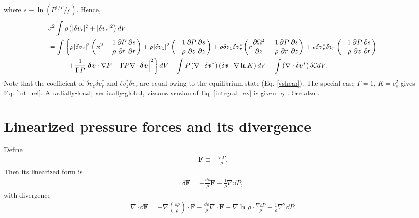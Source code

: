 where  $s\equiv\ln{(P^{1/\Gamma}/\rho)}$. Hence,
\begin{align}\label{integral_ex}
  &\sigma^2\int\rho\left(|\delta v_r|^2 + |\delta v_z|^2\right)dV \notag\\
&=  \int\left\{
  \rho |\delta v_r|^2 \left(\kappa^2 - \frac{1}{\rho}\frac{\partial P}{\partial
    r}\frac{\partial s}{\partial r}\right)
  + \rho |\delta v_z|^2\left(-\frac{1}{\rho}\frac{\partial P}{\partial
    z}\frac{\partial s}{\partial z}\right)
   + \rho \delta v_z \delta v_r^*\left(r\frac{\partial\Omega^2}{\partial z} -
  \frac{1}{\rho}\frac{\partial P}{\partial
    r}\frac{\partial s}{\partial z}\right) 
  + \rho \delta v_z^*\delta v_r \left(-\frac{1}{\rho}\frac{\partial P}{\partial
    z}\frac{\partial s}{\partial r}\right)\right. \notag\\
&\phantom{==\int}\left.+
 \frac{1}{\Gamma P}\Bigl\lvert \bm{\delta v}\cdot\nabla P +
 \Gamma P\nabla\cdot\bm{\delta v}     \Bigr\rvert^2
  \right\}dV 
-\int    P\left(\nabla\cdot\delta\bm{v}^*\right)\left(\delta\bm{v}\cdot\nabla\ln{K}\right)dV
  -\int \left(\nabla\cdot\delta\bm{v}^*\right)\delta\mathcal{C}dV.  
\end{align}
Note that the coefficient of $\delta v_z\delta v_r^*$ and $\delta
v_z^*\delta v_r$ are equal owing to the
equilibrium state (Eq. \ref{vshear}). 
The special case $\Gamma=1,\, K = c_s^2$ gives
Eq. \ref{int_rel}. A radially-local, vertically-global, viscous version of
Eq. \ref{integral_ex} is given by \cite{latter06}. See also
\cite{kato78} . 


\section{Linearized pressure forces and its divergence}\label{lin_press}
Define
\begin{align}
  \bm{F} \equiv - \frac{\nabla P}{\rho}. 
\end{align}
Then its linearized form is 
\begin{align}
  \delta \bm{F} = - \frac{\dd\rho}{\rho}\bm{F} -
  \frac{1}{\rho}\nabla\dd P,
\end{align}
with divergence
\begin{align}
  \nabla\cdot\dd\bm{F} = -
  \nabla\left(\frac{\dd\rho}{\rho}\right)\cdot\bm{F} -
  \frac{\dd\rho}{\rho}\nabla\cdot\bm{F} +
  \nabla\ln{\rho}\cdot\frac{\nabla\dd P}{\rho} -
  \frac{1}{\rho}\nabla^2\dd P. 
\end{align}

